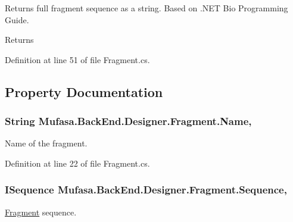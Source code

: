Returns full fragment sequence as a string. Based on .N\+E\+T Bio Programming Guide. 

\begin{DoxyReturn}{Returns}

\end{DoxyReturn}


Definition at line 51 of file Fragment.\+cs.



\subsection{Property Documentation}
\hypertarget{class_mufasa_1_1_back_end_1_1_designer_1_1_fragment_afc4866f3035e0bfb94928c61ad2de87d}{
\subsubsection[{Name}]{\setlength{\rightskip}{0pt plus 5cm}String Mufasa.\+Back\+End.\+Designer.\+Fragment.\+Name\hspace{0.3cm}{\ttfamily [get]}, {\ttfamily [set]}}}\label{class_mufasa_1_1_back_end_1_1_designer_1_1_fragment_afc4866f3035e0bfb94928c61ad2de87d}


Name of the fragment. 



Definition at line 22 of file Fragment.\+cs.

\hypertarget{class_mufasa_1_1_back_end_1_1_designer_1_1_fragment_a2cf8143b247df2db90ddb64f1019c7cc}{
\subsubsection[{Sequence}]{\setlength{\rightskip}{0pt plus 5cm}I\+Sequence Mufasa.\+Back\+End.\+Designer.\+Fragment.\+Sequence\hspace{0.3cm}{\ttfamily [get]}, {\ttfamily [set]}}}\label{class_mufasa_1_1_back_end_1_1_designer_1_1_fragment_a2cf8143b247df2db90ddb64f1019c7cc}


\hyperlink{class_mufasa_1_1_back_end_1_1_designer_1_1_fragment}{Fragment} sequence. 



